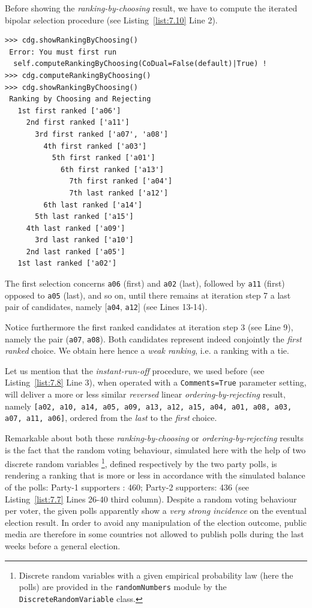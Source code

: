 Before showing the \emph{ranking-by-choosing} result, we have to compute the iterated bipolar selection procedure (see Listing~\vref{list:7.10} Line 2).
\begin{lstlisting}[caption={Ranking by iterating choosing the \emph{first} and \emph{last} remaining candidates },label=list:7.10]
>>> cdg.showRankingByChoosing()
 Error: You must first run
  self.computeRankingByChoosing(CoDual=False(default)|True) !
>>> cdg.computeRankingByChoosing()
>>> cdg.showRankingByChoosing()
 Ranking by Choosing and Rejecting
   1st first ranked ['a06']
     2nd first ranked ['a11']
       3rd first ranked ['a07', 'a08']
         4th first ranked ['a03']
           5th first ranked ['a01']
             6th first ranked ['a13']
               7th first ranked ['a04']
               7th last ranked ['a12']
	     6th last ranked ['a14']
	   5th last ranked ['a15']
	 4th last ranked ['a09']
       3rd last ranked ['a10']
     2nd last ranked ['a05']
   1st last ranked ['a02']
\end{lstlisting}
The first selection concerns \texttt{a06} (first) and \texttt{a02} (last), followed by \texttt{a11} (first) opposed to \texttt{a05} (last), and so on, until there remains at iteration step 7 a last pair of candidates, namely [\texttt{a04}, \texttt{a12}] (see Lines 13-14).

Notice furthermore the first ranked candidates at iteration step 3 (see Line 9), namely the pair (\texttt{a07}, \texttt{a08}). Both candidates represent indeed conjointly the \emph{first ranked} choice. We obtain here hence a \emph{weak ranking}, i.e. a ranking with a tie.

Let us mention that the \emph{instant-run-off} procedure, we used before (see Listing~\vref{list:7.8} Line 3), when operated with a \texttt{Comments=True} parameter setting, will deliver a more or less similar \emph{reversed} linear \emph{ordering-by-rejecting} result, namely \texttt{[a02, a10, a14, a05, a09, a13, a12, a15, a04, a01, a08, a03, a07, a11, a06]}, ordered from the \emph{last} to the \emph{first} choice.

Remarkable about both these \emph{ranking-by-choosing} or \emph{ordering-by-rejecting} results is the fact that the random voting behaviour, simulated here with the help of two discrete random variables \footnote{Discrete random variables with a given empirical probability law (here the polls) are provided in the \texttt{randomNumbers} module by the \texttt{DiscreteRandomVariable} class.}, defined respectively by the two party polls, is rendering a ranking that is more or less in accordance with the simulated balance of the polls: Party-1 supporters : 460;  Party-2 supporters: 436 (see Listing~\vref{list:7.7} Lines 26-40 third column). Despite a random voting behaviour per voter, the given polls apparently show a \emph{very strong incidence} on the eventual election result. In order to avoid any manipulation of the election outcome, public media are therefore in some countries not allowed to publish polls during the last weeks before a general election.

